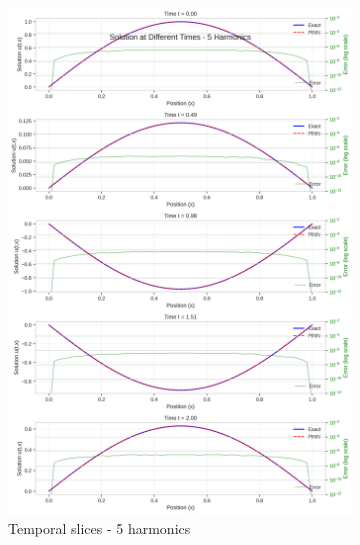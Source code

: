 \begin{figure}[H]
    \centering
    \begin{subfigure}[b]{0.48\textwidth}
        \centering
        \includegraphics[width=\textwidth]{figures/time_slices_5h.png}
        \caption{Temporal slices - 5 harmonics}
    \end{subfigure}
    \hfill
    \begin{subfigure}[b]{0.48\textwidth}
        \centering

\end{subfigure}
\end{figure}
